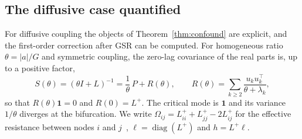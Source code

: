 
\subsection{The diffusive case quantified}\label{sec:diffusive-q}

For diffusive coupling the objects of Theorem~\ref{thm:confound} are explicit, and the first-order
correction after GSR can be computed. For homogeneous ratio $\theta=|a|/G$ and symmetric coupling, the
zero-lag covariance of the real parts is, up to a positive factor,
\begin{equation}\label{eq:S-theta}
  S(\theta)=(\theta I+L)^{-1}=\frac1\theta\,P+R(\theta),\qquad
  R(\theta)=\sum_{k\ge2}\frac{u_ku_k^{\top}}{\theta+\lambda_k},
\end{equation}
so that $R(\theta)\mathbf 1=0$ and $R(0)=L^{+}$. The critical mode is $\mathbf 1$ and its variance
$1/\theta$ diverges at the bifurcation. We write
$\Omega_{ij}=L^{+}_{ii}+L^{+}_{jj}-2L^{+}_{ij}$ for the effective resistance between nodes $i$ and $j$~\cite{Klein1993},
$\ell=\operatorname{diag}(L^{+})$ and $h=L^{+}\ell$.

